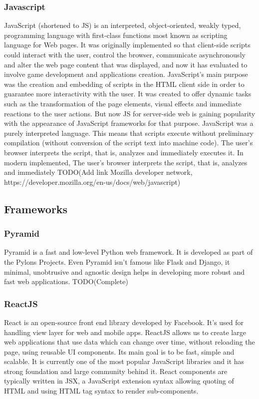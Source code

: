\subsubsection{Javascript}
JavaScript (shortened to JS) is an interpreted, object-oriented, weakly typed,
programming language with first-class functions most known as scripting language
for Web pages. It was originally implemented so that client-side scripts could
interact with the user, control the browser, communicate asynchronously and
alter the web page content that was displayed, and now it has evaluated to
involve game  development and applications creation. JavaScript's main purpose
was the creation and embedding of scripts in the HTML client side in order to
guarantee more interactivity with the user. It was created to offer dynamic
tasks such as the transformation of the page elements, visual effects and
immediate reactions to the user actions. But now JS for server-side web is
gaining popularity with the appearance of JavaScript frameworks for that
purpose. 
JavaScript was a purely interpreted language. This means that scripts execute
without preliminary compilation (without conversion of the script text into
machine code). The user's browser interprets the script, that is, analyzes and
immediately executes it. In modern implemented, The user's browser interprets
the script, that is, analyzes and immediately 
TODO(Add link Mozilla developer network, https://developer.mozilla.org/en-us/docs/web/javascript)

\subsection{Frameworks}
\subsubsection{Pyramid}
Pyramid is a fast and low-level Python web framework. It is developed as
part of the Pylons Projects. Even Pyramid isn't famous like Flask and Django, it
minimal, unobtrusive and agnostic design helps in developing more robust and
fast web applications. TODO(Complete) 

\subsubsection{ReactJS}
React is an open-source front end library developed by Facebook. It's used for
handling view layer for web and mobile apps. ReactJS allows us to create large
web applications that use data which can change over time, without reloading the
page, using reusable UI components. Its main goal is to be fast, simple and
scalable. It is currently one of the most popular JavaScript libraries and it
has strong foundation and large community behind it. React components are
typically written in JSX, a JavaScript extension syntax allowing quoting of HTML
and using HTML tag syntax to render sub-components.

